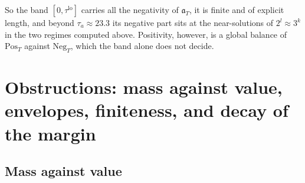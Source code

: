\documentclass[11pt]{amsart}
\theoremstyle{definition}
\theoremstyle{remark}
\begin{document}
So the band $[0,\tau^{\mathrm{lo}}]$ carries all the negativity of $\mathfrak a_T$, it is finite and of explicit
length, and beyond $\tau_a\approx23.3$ its negative part sits at the near-solutions of $2^l\approx3^k$ in the two
regimes computed above. Positivity, however, is a global balance of $\mathrm{Pos}_T$ against $\mathrm{Neg}_T$, which the
band alone does not decide.


\section{Obstructions: mass against value, envelopes, finiteness, and decay of the margin}\label{sec:negative}

\subsection{Mass against value}
\end{document}
